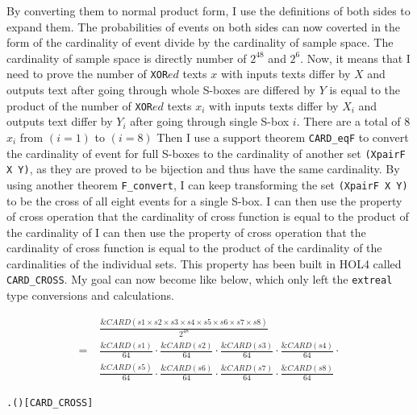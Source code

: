 \documentclass{article}
\begin{document}
By converting them to normal product form, I use the definitions
of both sides to expand them. The probabilities of events on both sides can now coverted in the form of the cardinality of event divide by
the cardinality of sample space. The cardinality of sample space is directly number of $2^{48}$ and $2^{6}$.
Now, it means that I need to prove the number of \verb|XOR|$ed$ texts $x$ with inputs texts differ by $X$ and outputs text after going through whole
S-boxes are differed by $Y$ is equal to
the product of the number of \verb|XOR|$ed$ texts $x_i$ with inputs texts differ by $X_i$ and outputs text differ by $Y_i$ after going through single
S-box $i$. There are a total of 8 $x_i$ from $(i=1)$ to $(i=8)$
Then I use a support theorem
\verb|CARD_eqF| to convert the cardinality of event for full S-boxes to the cardinality of another set \verb|(XpairF X Y)|, as they are proved
to be bijection and thus have the same cardinality. By using another theorem \verb|F_convert|, I can keep transforming the set \verb|(XpairF X Y)|
to be the cross of all eight events for a single S-box. I can then use the property of cross operation that the cardinality of cross function is equal
to the product of the cardinality of I can then use the property of cross operation that the cardinality of cross function is equal
to the product of the cardinality of the cardinalities of the individual sets. This property has been built in HOL4
called \verb|CARD_CROSS|. My goal can now become like below, which only left the \verb|extreal| type conversions and calculations.

\begin{align*}
   & \frac{\&CARD(s1 \times s2 \times s3 \times s4 \times s5 \times s6 \times s7 \times s8)}{2^{48}} \\
  = \; & \frac{\&CARD(s1)}{64} \cdot \frac{\&CARD(s2)}{64} \cdot \frac{\&CARD(s3)}{64} \cdot \frac{\&CARD(s4)}{64} \cdot \\
     & \frac{\&CARD(s5)}{64} \cdot \frac{\&CARD(s6)}{64} \cdot \frac{\&CARD(s7)}{64} \cdot \frac{\&CARD(s8)}{64}
\end{align*}

\begin{alltt}
\HOLTokenTurnstile{} \HOLSymConst{\HOLTokenForall{}} .   \HOLSymConst{\HOLTokenConj{}}   \HOLSymConst{\HOLTokenImp{}}  ( \HOLSymConst{\ensuremath{\times}} ) \HOLSymConst{=}   \HOLSymConst{\HOLTokenProd{}}  \hfill{[CARD_CROSS]}
\end{alltt}
\end{document}
